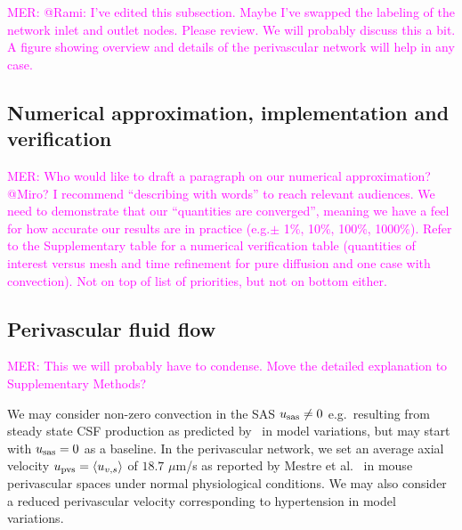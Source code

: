 \documentclass[fleqn,10pt]{wlscirep}
\newcommand{\mer}[1]{\textcolor{magenta}{#1}}
\begin{document}
\noindent \mer{MER: @Rami: I've edited this subsection. Maybe I've swapped the labeling of the network inlet and outlet nodes. Please review. We will probably discuss this a bit. A figure showing overview and details of the perivascular network will help in any case.}


\subsection*{Numerical approximation, implementation and verification}

\mer{MER: Who would like to draft a paragraph on our numerical approximation? @Miro? I recommend ``describing with words'' to reach relevant audiences. We need to demonstrate that our ``quantities are converged'', meaning we have a feel for how accurate our results are in practice (e.g.$\pm$ 1\%, 10\%, 100\%, 1000\%). Refer to the Supplementary table for a numerical verification table (quantities of interest versus mesh and time refinement for pure diffusion and one case with convection). Not on top of list of priorities, but not on bottom either.} 

\subsection*{Perivascular fluid flow}

\mer{MER: This we will probably have to condense. Move the detailed explanation to Supplementary Methods?}

We may consider non-zero convection in the SAS $u_{\rm sas} \not = 0$ e.g.~resulting from steady state CSF production as predicted by~\cite{hornkjol2022csf} in model variations, but may start with $u_{\rm sas} = 0$ as a baseline. In the perivascular network, we set an average axial velocity $u_{\rm pvs} = \langle u_{v, s} \rangle$ of $18.7$ $\mu$m/s as reported by Mestre et al.~\cite{mestre2018flow} in mouse perivascular spaces under normal physiological conditions. We may also consider a reduced perivascular velocity corresponding to hypertension in model variations.
\end{document}
